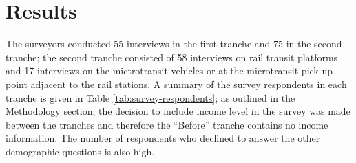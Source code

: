 \documentclass[smartcities,article,submit,moreauthors,pdftex]{mdpi}
\begin{document}
\hypertarget{results}{%
\section{Results}\label{results}}

The surveyors conducted 55 interviews in the first tranche and 75 in the second
tranche; the second tranche consisted of 58 interviews on rail transit platforms
and 17 interviews on the mictrotransit vehicles or at the microtransit pick-up
point adjacent to the rail stations. A summary of the survey respondents in each
tranche is given in Table \ref{tab:survey-respondents}; as outlined in the
Methodology section, the decision to include income level in the survey was made
between the tranches and therefore the ``Before'' tranche contains no income
information. The number of respondents who declined to answer the other
demographic questions is also high.
\end{document}
